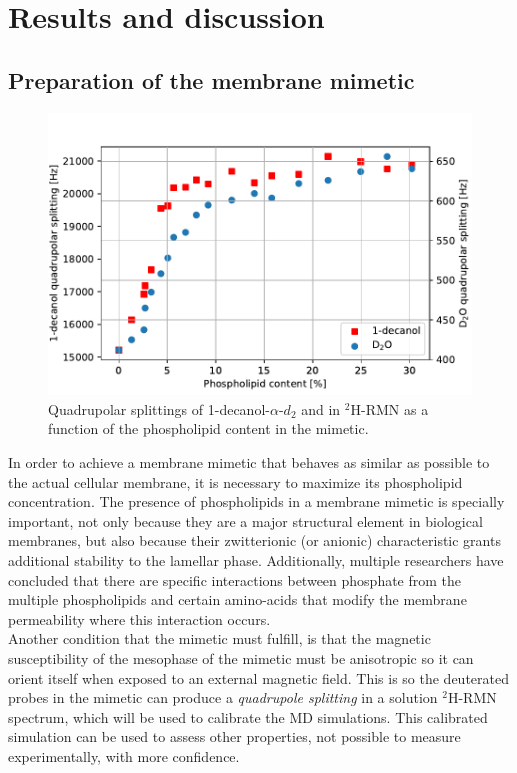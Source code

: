 \documentclass[3p,preprint,review]{elsarticle}
\begin{document}
	\section{Results and discussion}
	
	\subsection{Preparation of the membrane mimetic}
	
	\begin{figure}[h]
		\centering
		\includegraphics[width=\columnwidth]{splitting_v_phospholipid}
		\caption{Quadrupolar splittings of 1-decanol-$\alpha$-$d_2$ and  in
			$^2$H-RMN as a function of the phospholipid content in the mimetic.}
		\label{fig:1st_max}
	\end{figure}
	
	In order to achieve a membrane mimetic that behaves as similar as possible to
  the actual cellular membrane, it is necessary to maximize its phospholipid
  concentration. The presence of phospholipids in a membrane mimetic is
  specially important, not only because they are a major structural element in
  biological membranes, but also because their zwitterionic (or anionic)
  characteristic grants additional stability to the lamellar phase.
  Additionally, multiple researchers have concluded that there are
  specific interactions between phosphate from the multiple phospholipids and
  certain amino-acids that modify the membrane
	permeability where this interaction occurs\cite{Aliaga2011,Hristova2011}.\\
  
	Another condition that the mimetic must fulfill, is that the magnetic susceptibility of the mesophase of the mimetic must be anisotropic so it can orient itself when exposed to an external magnetic field. This is so the
  deuterated probes in the mimetic can produce a \textit{quadrupole splitting}
  in a solution $^2$H-RMN spectrum, which will be used to calibrate the MD
  simulations. This calibrated simulation can be used to assess other
  properties, not possible to measure experimentally, with more
	confidence.\\
	
\end{document}
